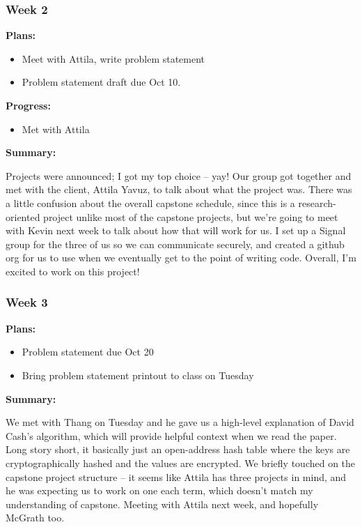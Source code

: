 \subsubsection{Week 2}

\noindent \textbf{Plans:}
\begin{itemize}
\item Meet with Attila, write problem statement
\item Problem statement draft due Oct 10.
\end{itemize}

\noindent \textbf{Progress:}
\begin{itemize}
\item Met with Attila
\end{itemize}

\noindent \textbf{Summary:}

Projects were announced; I got my top choice – yay! Our group got together and met with the client, Attila Yavuz, to talk about what the project was. There was a little confusion about the overall capstone schedule, since this is a research-oriented project unlike most of the capstone projects, but we're going to meet with Kevin next week to talk about how that will work for us. I set up a Signal group for the three of us so we can communicate securely, and created a github org for us to use when we eventually get to the point of writing code. Overall, I'm excited to work on this project!

\subsubsection{Week 3}

\noindent \textbf{Plans:}
\begin{itemize}
\item Problem statement due Oct 20
\item Bring problem statement printout to class on Tuesday
\end{itemize}

\noindent \textbf{Summary:}

We met with Thang on Tuesday and he gave us a high-level explanation of David Cash's algorithm, which will provide helpful context when we read the paper. Long story short, it basically just an open-address hash table where the keys are cryptographically hashed and the values are encrypted. We briefly touched on the capstone project structure – it seems like Attila has three projects in mind, and  he was expecting us to work on one each term, which doesn't match my understanding of capstone. Meeting with Attila next week, and hopefully McGrath too.


